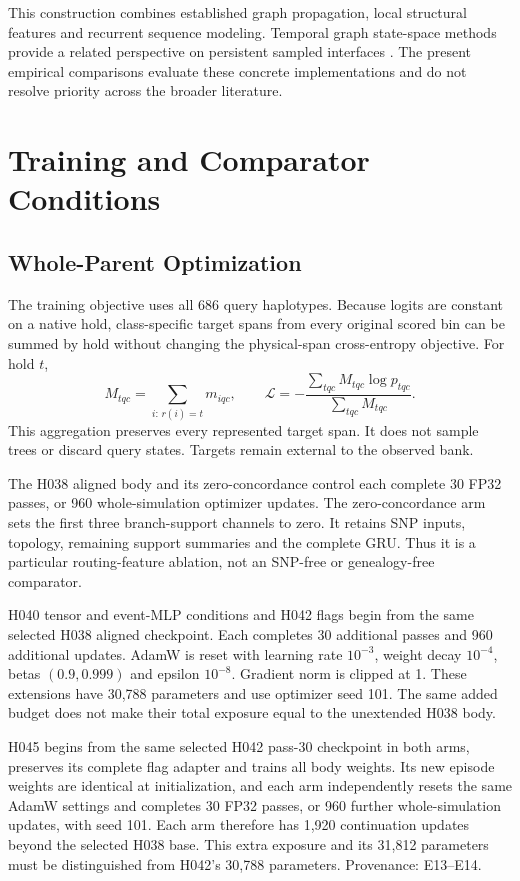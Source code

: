 \documentclass[letterpaper]{article}
\begin{document}
This construction combines established graph propagation, local structural features and recurrent sequence modeling. Temporal graph state-space methods provide a related perspective on persistent sampled interfaces \citep{graphssm2024}. The present empirical comparisons evaluate these concrete implementations and do not resolve priority across the broader literature.

\section{Training and Comparator Conditions}
\subsection{Whole-Parent Optimization}
The training objective uses all 686 query haplotypes. Because logits are constant on a native hold, class-specific target spans from every original scored bin can be summed by hold without changing the physical-span cross-entropy objective. For hold $t$,
\begin{equation}
M_{tqc}=\sum_{i:\,r(i)=t}m_{iqc},
\qquad
\mathcal{L}=-\frac{\sum_{tqc}M_{tqc}\log p_{tqc}}{\sum_{tqc}M_{tqc}}.
\end{equation}
This aggregation preserves every represented target span. It does not sample trees or discard query states. Targets remain external to the observed bank.

The H038 aligned body and its zero-concordance control each complete 30 FP32 passes, or 960 whole-simulation optimizer updates. The zero-concordance arm sets the first three branch-support channels to zero. It retains SNP inputs, topology, remaining support summaries and the complete GRU. Thus it is a particular routing-feature ablation, not an SNP-free or genealogy-free comparator.

H040 tensor and event-MLP conditions and H042 flags begin from the same selected H038 aligned checkpoint. Each completes 30 additional passes and 960 additional updates. AdamW is reset with learning rate $10^{-3}$, weight decay $10^{-4}$, betas $(0.9,0.999)$ and epsilon $10^{-8}$. Gradient norm is clipped at 1. These extensions have 30,788 parameters and use optimizer seed 101. The same added budget does not make their total exposure equal to the unextended H038 body.

H045 begins from the same selected H042 pass-30 checkpoint in both arms, preserves its complete flag adapter and trains all body weights. Its new episode weights are identical at initialization, and each arm independently resets the same AdamW settings and completes 30 FP32 passes, or 960 further whole-simulation updates, with seed 101. Each arm therefore has 1,920 continuation updates beyond the selected H038 base. This extra exposure and its 31,812 parameters must be distinguished from H042's 30,788 parameters. Provenance: E13--E14.
\end{document}
